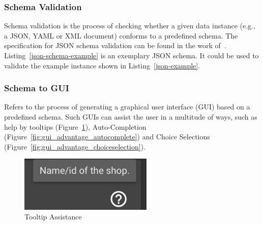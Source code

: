 \subsubsection{Schema Validation} %

Schema validation is the process of checking whether a given data instance (e.g., a JSON, YAML or XML document) conforms to a predefined schema.
The specification for JSON schema validation can be found in the work of~\cite{JSON_schema_vailidation,JSONValidation}.
Listing~\ref{json-schema-example} is an exemplary JSON schema.
It could be used to validate the example instance shown in Listing~\ref{json-example}.









\subsubsection{Schema to GUI}
Refers to the process of generating a graphical user interface (GUI) based on a predefined schema.
Such GUIs can assist the user in a multitude of ways, such as help by tooltips (Figure~\ref{fig:gui_advantage_tooltip}), Auto-Completion (Figure~\ref{fig:gui_advantage_autocomplete}) and Choice Selections (Figure~\ref{fig:gui_advantage_choiceselection}).

\begin{figure}[!t]
\centering
\includegraphics[width=2.5in]{figures/gui_advantage_tooltip}
\caption{Tooltip Assistance}
\label{fig:gui_advantage_tooltip}
\end{figure}


